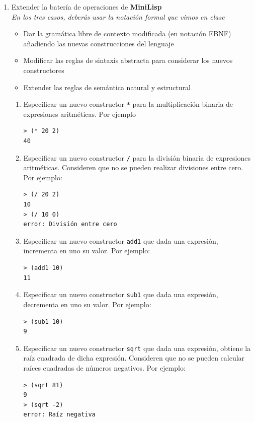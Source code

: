 \documentclass{article}
\begin{document}
\begin{enumerate}
    \item Extender la batería de operaciones de \textbf{MiniLisp}\\
      \textit{En los tres casos, deberás usar la notación formal que vimos en clase}
      \begin{itemize}
        \item Dar la gramática libre de contexto modificada (en notación EBNF) añadiendo las nuevas construcciones del lenguaje
        \item Modificar las reglas de sintaxis abstracta para considerar los nuevos constructores
        \item Extender las reglas de semántica natural y estructural 
      \end{itemize}
      \begin{enumerate}
        \item Especificar un nuevo constructor \texttt{*} para la multiplicación binaria de expresiones aritméticas. Por ejemplo
          \begin{verbatim}
> (* 20 2)
40
          \end{verbatim}

        \item Especificar un nuevo constructor \texttt{/} para la división binaria de expresiones aritméticas. Consideren que no se pueden realizar divisiones entre cero. Por ejemplo:
          \begin{verbatim}
> (/ 20 2)
10
> (/ 10 0)
error: División entre cero
          \end{verbatim}

        \item Especificar un nuevo constructor \texttt{add1} que dada una expresión, incrementa en uno su valor. Por ejemplo:
          \begin{verbatim}
> (add1 10)
11
          \end{verbatim}

        \item Especificar un nuevo constructor \texttt{sub1} que dada una expresión, decrementa en uno su valor. Por ejemplo:
          \begin{verbatim}
> (sub1 10)
9
          \end{verbatim}

        \item Especificar un nuevo constructor \texttt{sqrt} que dada una expresión, obtiene la raíz cuadrada de dicha expresión. Consideren que no se pueden calcular raíces cuadradas de números negativos. Por ejemplo:
          \begin{verbatim}
> (sqrt 81)
9
> (sqrt -2)
error: Raíz negativa
          \end{verbatim}
      \end{enumerate}

  \end{enumerate}
\end{document}
